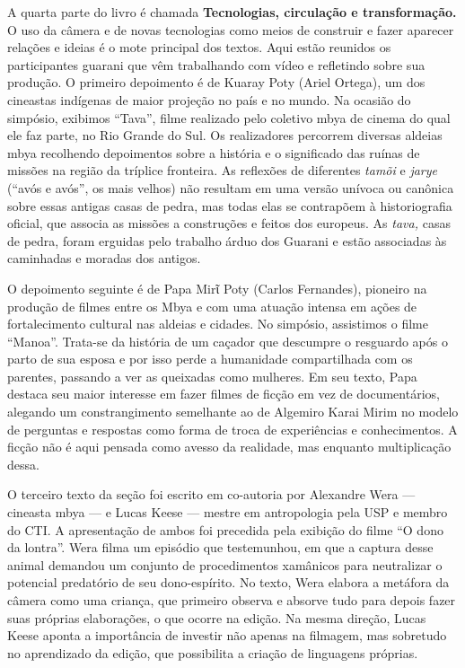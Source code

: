 A quarta parte do livro é chamada \textbf{Tecnologias, circulação e
transformação.} O uso da câmera e de novas tecnologias como meios de
construir e fazer aparecer relações e ideias é o mote principal dos
textos. Aqui estão reunidos os participantes guarani que vêm trabalhando
com vídeo e refletindo sobre sua produção. O primeiro depoimento é de
Kuaray Poty (Ariel Ortega), um dos cineastas indígenas de maior projeção
no país e no mundo. Na ocasião do simpósio, exibimos ``Tava'', filme
realizado pelo coletivo mbya de cinema do qual ele faz parte, no Rio
Grande do Sul. Os realizadores percorrem diversas aldeias mbya
recolhendo depoimentos sobre a história e o significado das ruínas de
missões na região da tríplice fronteira. As reflexões de diferentes
\emph{tamõi} e \emph{jarye} (``avós e avós'', os mais velhos) não
resultam em uma versão unívoca ou canônica sobre essas antigas casas de
pedra, mas todas elas se contrapõem à historiografia oficial, que
associa as missões a construções e feitos dos europeus. As \emph{tava,}
casas de pedra, foram erguidas pelo trabalho árduo dos Guarani e estão
associadas às caminhadas e moradas dos antigos.

O depoimento seguinte é de Papa Mirῖ Poty (Carlos Fernandes), pioneiro
na produção de filmes entre os Mbya e com uma atuação intensa em ações
de fortalecimento cultural nas aldeias e cidades. No simpósio,
assistimos o filme ``Manoa''. Trata-se da história de um caçador que
descumpre o resguardo após o parto de sua esposa e por isso perde a
humanidade compartilhada com os parentes, passando a ver as queixadas
como mulheres. Em seu texto, Papa destaca seu maior interesse em fazer
filmes de ficção em vez de documentários, alegando um constrangimento
semelhante ao de Algemiro Karai Mirim no modelo de perguntas e respostas
como forma de troca de experiências e conhecimentos. A ficção não é aqui
pensada como avesso da realidade, mas enquanto multiplicação dessa.

O terceiro texto da seção foi escrito em co-autoria por Alexandre Wera
--- cineasta mbya --- e Lucas Keese --- mestre em antropologia pela USP
e membro do CTI. A apresentação de ambos foi precedida pela exibição do
filme ``O dono da lontra''. Wera filma um episódio que testemunhou, em
que a captura desse animal demandou um conjunto de procedimentos
xamânicos para neutralizar o potencial predatório de seu dono-espírito.
No texto, Wera elabora a metáfora da câmera como uma criança, que
primeiro observa e absorve tudo para depois fazer suas próprias
elaborações, o que ocorre na edição. Na mesma direção, Lucas Keese
aponta a importância de investir não apenas na filmagem, mas sobretudo
no aprendizado da edição, que possibilita a criação de linguagens
próprias.


